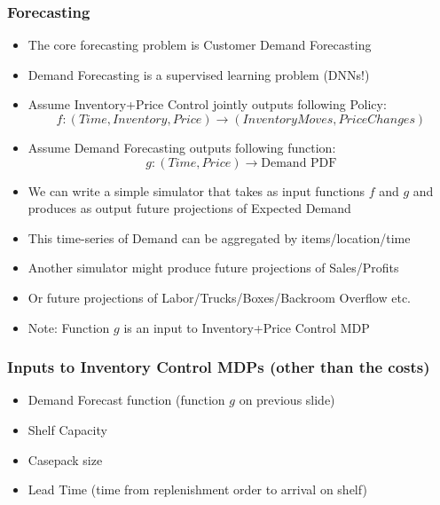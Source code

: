 \documentclass[handout]{beamer}
\begin{document}
\begin{frame}
\frametitle{Forecasting}
\pause
\begin{itemize}[<+->]
\item The core forecasting problem is Customer Demand Forecasting
\item Demand Forecasting is a supervised learning problem (DNNs!)
\item Assume Inventory+Price Control jointly outputs following Policy:
$$f: (Time, Inventory, Price) \rightarrow (Inventory Moves, Price Changes)$$
\item Assume Demand Forecasting outputs following function:
$$g:(Time, Price) \rightarrow \mbox{Demand PDF}$$
\item We can write a simple simulator that takes as input functions $f$ and $g$ and produces as output future projections of Expected Demand
\item This time-series of Demand can be aggregated by items/location/time
\item Another simulator might produce future projections of Sales/Profits
\item Or future projections of Labor/Trucks/Boxes/Backroom Overflow etc.
\item Note: Function $g$ is an input to Inventory+Price Control MDP
\end{itemize}
\end{frame}


\begin{frame}
\frametitle{Inputs to Inventory Control MDPs (other than the costs)}
\pause
\begin{itemize}[<+->]
\item Demand Forecast function (function $g$ on previous slide)
\item Shelf Capacity
\item Casepack size
\item Lead Time (time from replenishment order to arrival on shelf)
\end{itemize}
\end{frame}
\end{document}

